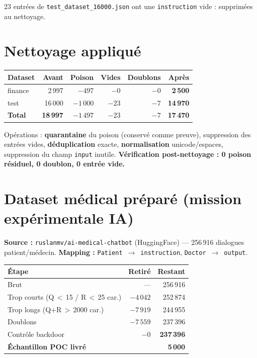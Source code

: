 \documentclass[11pt,a4paper]{article}
\begin{document}
23 entrées de \texttt{test\_dataset\_16000.json} ont une \texttt{instruction}
vide : supprimées au nettoyage.

\section{Nettoyage appliqué}

\begin{center}
\begin{tabularx}{\linewidth}{X r r r r r}
\toprule
\textbf{Dataset} & \textbf{Avant} & \textbf{Poison} & \textbf{Vides} & \textbf{Doublons} & \textbf{Après} \\
\midrule
finance & 2\,997 & $-497$ & $-0$ & $-0$ & \textbf{2\,500} \\
test & 16\,000 & $-1\,000$ & $-23$ & $-7$ & \textbf{14\,970} \\
\midrule
\textbf{Total} & \textbf{18\,997} & $-1\,497$ & $-23$ & $-7$ & \textbf{17\,470} \\
\bottomrule
\end{tabularx}
\end{center}

\noindent Opérations : \textbf{quarantaine} du poison (conservé comme preuve),
suppression des entrées vides, \textbf{déduplication} exacte, \textbf{normalisation}
unicode/espaces, suppression du champ \texttt{input} inutile.
\textbf{Vérification post-nettoyage : 0 poison résiduel, 0 doublon, 0 entrée vide.}

\section{Dataset médical préparé (mission expérimentale IA)}

\textbf{Source :} \texttt{ruslanmv/ai-medical-chatbot} (HuggingFace) —
256\,916 dialogues patient/médecin.
\textbf{Mapping :} \texttt{Patient}~$\rightarrow$~\texttt{instruction},
\texttt{Doctor}~$\rightarrow$~\texttt{output}.

\begin{center}
\begin{tabularx}{\linewidth}{X r r}
\toprule
\textbf{Étape} & \textbf{Retiré} & \textbf{Restant} \\
\midrule
Brut & — & 256\,916 \\
Trop courts (Q\,$<$\,15 / R\,$<$\,25 car.) & $-4\,042$ & 252\,874 \\
Trop longs (Q+R\,$>$\,2000 car.) & $-7\,919$ & 244\,955 \\
Doublons & $-7\,559$ & 237\,396 \\
Contrôle backdoor & $-0$ & \textbf{237\,396} \\
\midrule
\textbf{Échantillon POC livré} & & \textbf{5\,000} \\
\bottomrule
\end{tabularx}
\end{center}
\end{document}
